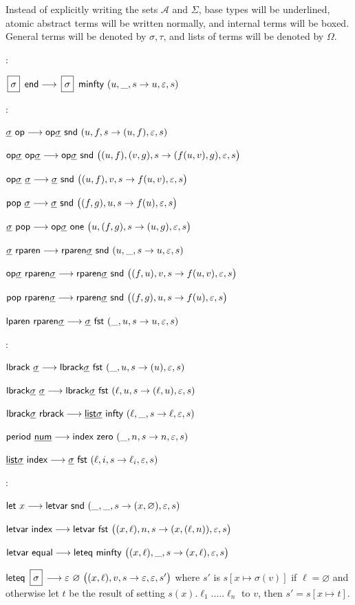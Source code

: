 \documentclass{llncs}
\begin{document}
Instead of explicitly writing the sets $\mathcal A$ and $\Sigma$, base types will be underlined, atomic abstract terms will be written normally, and internal terms will be boxed.
General terms will be denoted by $\sigma,\tau$, and lists of terms will be denoted by $\Omega$.

:
\blist
    \item $\isig\ \eend \longto \isig\ \minfty\ (u,\_,s\to u,\epsilon,s)$
\elist

:
\blist
    \item $\tsig\ \op \longto \op\tsig\ \snd\ (u,f,s\to(u,f),\epsilon,s)$
    \item $\op\tsig\ \op\tsig \longto \op\tsig\ \snd\ \bigl((u,f),(v,g),s\to (f(u,v),g),\epsilon,s\bigr)$
    \item $\op\tsig\ \tsig \longto \tsig\ \snd\ \bigl((u,f),v,s\to f(u,v),\epsilon,s\bigr)$
    \item $\Pop\ \tsig \longto \tsig\ \snd\ \bigl((f,g),u,s\to f(u),\epsilon,s\bigr)$
    \item $\tsig\ \Pop \longto \op\tsig\ {\sf one}\ \bigl(u,(f,g),s\to(u,g),\epsilon,s\bigr)$
    \item $\tsig\ \rparen \longto \rparen\tsig\ \snd\ (u,\_,s\to u,\epsilon,s)$
    \item $\textsf{op}{\underline{\mathsf{\sigma}}}\ \textsf{rparen}{\underline{\mathsf{\sigma}}} \longrightarrow \textsf{rparen}{\underline{\mathsf{\sigma}}}\ \mathsf{snd}\ \bigl((f,u),v,s\to f(u,v),\varepsilon,s\bigr)$
    \item $\Pop\ \rparen\tsig \longto \rparen\tsig\ \snd\ \bigl((f,g),u,s\to f(u),\epsilon,s\bigr)$
    \item $\lparen\ \rparen\tsig \longto \tsig\ \fst\ (\_,u,s\to u,\epsilon,s)$
\elist

:
\blist
    \item $\Lbrack\ \tsig \longto \Lbrack\tsig\ \fst\ (\_,u,s\to (u),\epsilon,s)$
    \item $\Lbrack\tsig\ \tsig \longto \Lbrack\tsig\ \fst\ (\ell,u,s\to (\ell,u),\epsilon,s)$
    \item $\Lbrack\tsig\ \Rbrack \longto \List\tsig\ \pinfty\ (\ell,\_,s\to\ell,\epsilon,s)$
    \item $\period\ \num \longto \index\ \zero\ (\_,n,s\to n,\epsilon,s)$
    \item $\List\tsig\ \index \longto \tsig\ \fst\ (\ell,i,s\to \ell_i,\epsilon,s)$
\elist

:
\blist
    \item $\lett\ x \longto \letvar\ \snd\ (\_,\_,s\to(x,\varnothing),\epsilon,s)$
    \item $\letvar\ \index \longto \letvar\ \fst\ \bigl((x,\ell),n,s\to(x,(\ell,n)),\epsilon,s\bigr)$
    \item $\letvar\ \equal \longto \leteq\ \minfty\ \bigl((x,\ell),\_,s\to(x,\ell),\epsilon,s\bigr)$
    \item $\leteq\ \isig \longto \epsilon\ \varnothing\ \bigl((x,\ell),v,s\to\epsilon,\epsilon,s'\bigr)$ where $s'$ is $s[x\mapsto\sigma(v)]$ if $\ell=\varnothing$ and otherwise let $t$ be the result of
        setting $s(x).\ell_1.\dots.\ell_n$ to $v$, then $s'=s[x\mapsto t]$.
\elist
\end{document}
